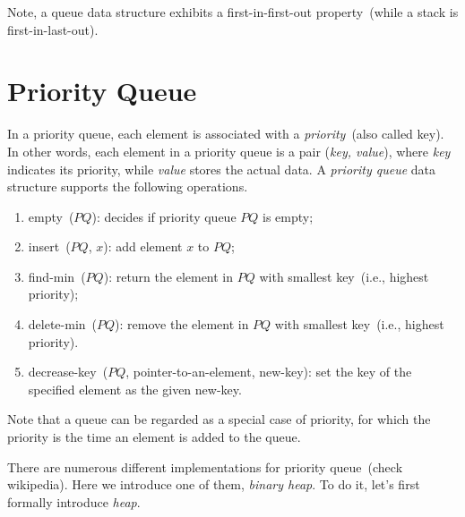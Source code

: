 \begin{minipage}{0.8\textwidth}
	\xxx
	\xxx
	\xxx
\end{minipage}

\begin{minipage}{0.8\textwidth}
	\xxx
	\xxx
	\xxx
\end{minipage}

Note, a queue data structure exhibits a first-in-first-out property~(while a stack is first-in-last-out).

\section*{Priority Queue}

In a priority queue, each element is associated with a \emph{priority}~(also called key).
In other words, each element in a priority queue is a pair (\emph{key, value}),
where \emph{key} indicates its priority, while \emph{value} stores the actual data.
A \emph{priority queue} data structure supports the following operations.
\vspace*{-\topsep}
\begin{enumerate}
\item empty~($PQ$): decides if priority queue $PQ$ is empty;
\item insert~($PQ$, $x$): add element $x$ to $PQ$;
\item find-min~($PQ$): return the element in $PQ$ with smallest key~(i.e., highest priority);
\item delete-min~($PQ$): remove the element in $PQ$ with smallest key~(i.e., highest priority).
\item decrease-key~($PQ$, pointer-to-an-element, new-key): set the key of the specified element as the given new-key.
\end{enumerate}

Note that a queue can be regarded as a special case of priority, for which the priority
is the time an element is added to the queue.

There are numerous different implementations for priority queue~(check wikipedia). 
Here we introduce one of them, \emph{binary heap}. To do it, let's first
formally introduce \emph{heap}.


